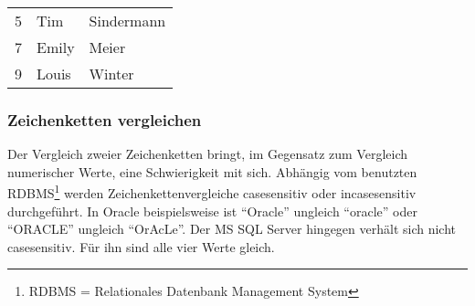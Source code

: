           \begin{center}
            \begin{small}
              \tablehead{}
              \begin{msoraclesql}
                \begin{supertabular}{rll}
                5 & Tim & Sindermann \\
                7 & Emily & Meier \\
                9 & Louis & Winter \\
                \end{supertabular}
              \end{msoraclesql}
            \end{small}
          \end{center}
\clearpage
        \subsubsection{Zeichenketten vergleichen}
          \label{stringdiff}
          Der Vergleich zweier Zeichenketten bringt, im Gegensatz zum Vergleich numerischer Werte, eine Schwierigkeit mit sich. Abh\"angig vom benutzten RDBMS\footnote{RDBMS = Relationales Datenbank Management System} werden Zeichenkettenvergleiche casesensitiv oder incasesensitiv durchgef\"uhrt. In Oracle beispielsweise ist \enquote{Oracle} ungleich \enquote{oracle} oder \enquote{ORACLE} ungleich \enquote{OrAcLe}. Der MS SQL Server hingegen verh\"alt sich nicht casesensitiv. F\"ur ihn sind alle vier Werte gleich.

